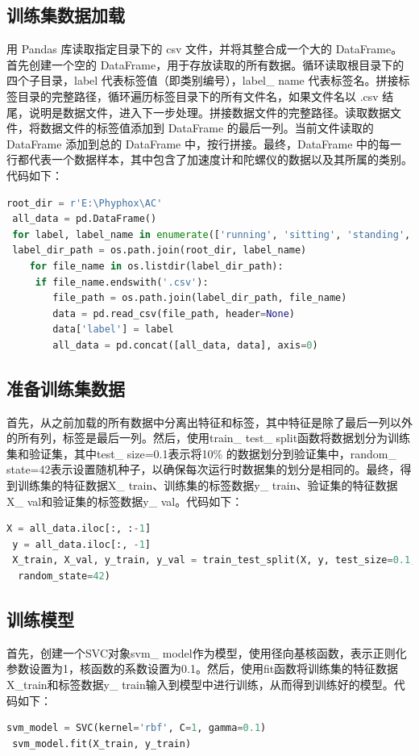 \documentclass[UTF8]{ctexart}
\begin{document}
\subsection{训练集数据加载}
用 Pandas 库读取指定目录下的 csv 文件，并将其整合成一个大的 DataFrame。首先创建一个空的 DataFrame，用于存放读取的所有数据。循环读取根目录下的四个子目录，label 代表标签值（即类别编号），label\_ name 代表标签名。拼接标签目录的完整路径，循环遍历标签目录下的所有文件名，如果文件名以 .csv 结尾，说明是数据文件，进入下一步处理。拼接数据文件的完整路径。读取数据文件，将数据文件的标签值添加到 DataFrame 的最后一列。当前文件读取的 DataFrame 添加到总的 DataFrame 中，按行拼接。最终，DataFrame 中的每一行都代表一个数据样本，其中包含了加速度计和陀螺仪的数据以及其所属的类别。代码如下：\\
\begin{lstlisting}[language=python, basicstyle=\ttfamily]
 root_dir = r'E:\Phyphox\AC'
 all_data = pd.DataFrame()
 for label, label_name in enumerate(['running', 'sitting', 'standing', 'walking']):
 label_dir_path = os.path.join(root_dir, label_name)
    for file_name in os.listdir(label_dir_path):
     if file_name.endswith('.csv'):
        file_path = os.path.join(label_dir_path, file_name)
        data = pd.read_csv(file_path, header=None)
        data['label'] = label
        all_data = pd.concat([all_data, data], axis=0)
\end{lstlisting}

\subsection{准备训练集数据}
首先，从之前加载的所有数据中分离出特征和标签，其中特征是除了最后一列以外的所有列，标签是最后一列。然后，使用train\_ test\_ split函数将数据划分为训练集和验证集，其中test\_ size=0.1表示将10\% 的数据划分到验证集中，random\_ state=42表示设置随机种子，以确保每次运行时数据集的划分是相同的。最终，得到训练集的特征数据X\_ train、训练集的标签数据y\_ train、验证集的特征数据X\_ val和验证集的标签数据y\_ val。代码如下：
\begin{lstlisting}[language=python, basicstyle=\ttfamily]
 X = all_data.iloc[:, :-1]
 y = all_data.iloc[:, -1]
 X_train, X_val, y_train, y_val = train_test_split(X, y, test_size=0.1,     
  random_state=42)
\end{lstlisting}
\subsection{训练模型}
首先，创建一个SVC对象svm\_ model作为模型，使用径向基核函数，表示正则化参数设置为1，核函数的系数设置为0.1。然后，使用fit函数将训练集的特征数据X\_train和标签数据y\_ train输入到模型中进行训练，从而得到训练好的模型。代码如下：\\
\begin{lstlisting}[language=python, basicstyle=\ttfamily]
 svm_model = SVC(kernel='rbf', C=1, gamma=0.1)
 svm_model.fit(X_train, y_train)
\end{lstlisting}
\end{document}
